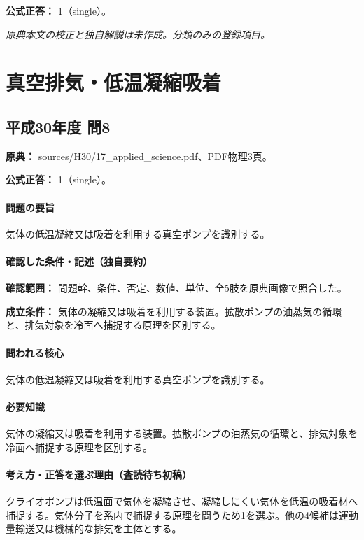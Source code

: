 \textbf{公式正答：} 1（single）。

\par\textit{原典本文の校正と独自解説は未作成。分類のみの登録項目。}

\section{真空排気・低温凝縮吸着}

\subsection{平成30年度 問8}
\label{q:h30-reg-applied-08}

\noindent\textbf{原典：} sources/H30/17\_applied\_science.pdf、PDF物理3頁。

\textbf{公式正答：} 1（single）。

\paragraph{問題の要旨} 気体の低温凝縮又は吸着を利用する真空ポンプを識別する。

\paragraph{確認した条件・記述（独自要約）}\mbox{}\par

\noindent\textbf{確認範囲：} 問題幹、条件、否定、数値、単位、全5肢を原典画像で照合した。\par

\noindent\textbf{成立条件：} 気体の凝縮又は吸着を利用する装置。拡散ポンプの油蒸気の循環と、排気対象を冷面へ捕捉する原理を区別する。\par

\paragraph{問われる核心} 気体の低温凝縮又は吸着を利用する真空ポンプを識別する。

\paragraph{必要知識} 気体の凝縮又は吸着を利用する装置。拡散ポンプの油蒸気の循環と、排気対象を冷面へ捕捉する原理を区別する。

\paragraph{考え方・正答を選ぶ理由（査読待ち初稿）} クライオポンプは低温面で気体を凝縮させ、凝縮しにくい気体を低温の吸着材へ捕捉する。気体分子を系内で捕捉する原理を問うため1を選ぶ。他の4候補は運動量輸送又は機械的な排気を主体とする。

